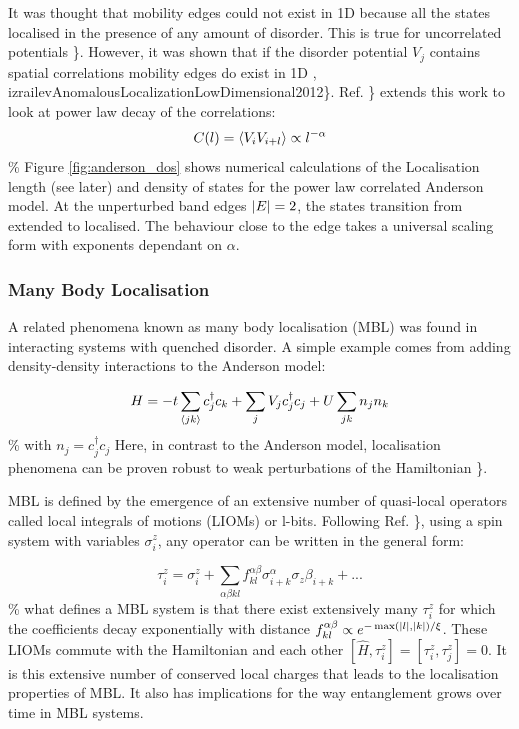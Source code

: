 It was thought that mobility edges could not exist in 1D because all the states localised in the presence of any amount of disorder. This is true for uncorrelated potentials \textcite{goldshteinPurePointSpectrum1977}\}. However, it was shown that if the disorder potential \(V_j\) contains spatial correlations mobility edges do exist in 1D \textcite{izrailevLocalizationMobilityEdge1999}, izrailevAnomalousLocalizationLowDimensional2012\}. Ref. \textcite{croyAndersonLocalization1D2011}\} extends this work to look at power law decay of the correlations: \[ C(l) = \langle V_i V_{i+l} \rangle \propto l^{-\alpha} \] \% Figure \ref{fig:anderson_dos} shows numerical calculations of the Localisation length (see later) and density of states for the power law correlated Anderson model. At the unperturbed band edges \(\abs{E} = 2\), the states transition from extended to localised. The behaviour close to the edge takes a universal scaling form with exponents dependant on \(\alpha\).

\hypertarget{many-body-localisation}{%
\subsubsection{Many Body Localisation}\label{many-body-localisation}}

A related phenomena known as many body localisation (MBL) was found in interacting systems with quenched disorder. A simple example comes from adding density-density interactions to the Anderson model:

\[
H = -t\sum_{\langle jk \rangle} c^\dagger_j c_k + \sum_j V_j c_j^\dagger c_j + U\sum_{jk} n_j n_k
\] \% with \(n_j = c^\dagger_j c_j\) Here, in contrast to the Anderson model, localisation phenomena can be proven robust to weak perturbations of the Hamiltonian \textcite{imbrieManyBodyLocalizationQuantum2016}\}.

MBL is defined by the emergence of an extensive number of quasi-local operators called local integrals of motions (LIOMs) or l-bits. Following Ref. \textcite{abaninRecentProgressManybody2017}\}, using a spin system with variables \(\sigma^z_i\), any operator can be written in the general form:

\[ \tau^z_i = \sigma^z_i + \sum_{\alpha\beta kl} f_{kl}^{\alpha\beta} \sigma^\alpha_{i+k} \sigma_z\beta_{i+k} + ...\] \% what defines a MBL system is that there exist extensively many \(\tau^z_i\) for which the coefficients decay exponentially with distance \(f_{kl}^{\alpha\beta} \propto e^{-\max(\abs{l},\abs{k}) / \xi}\). These LIOMs commute with the Hamiltonian and each other \([\hat{H}, \tau^z_i] = [\tau^z_i, \tau^z_j] = 0\). It is this extensive number of conserved local charges that leads to the localisation properties of MBL. It also has implications for the way entanglement grows over time in MBL systems.

